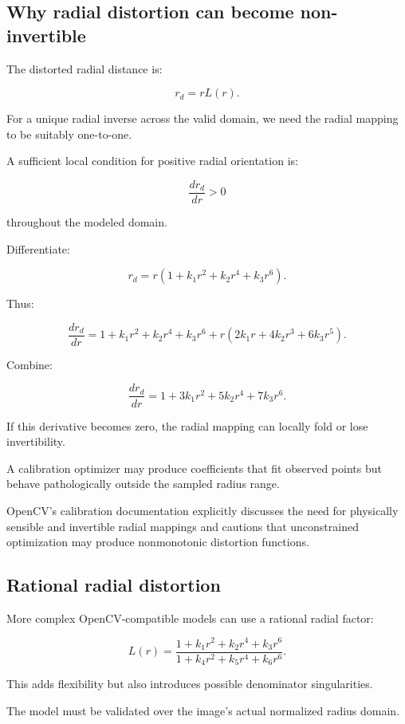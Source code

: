 \subsection{Why radial distortion can become non-invertible}\label{02-foundations-ii-ch035-why-radial-distortion-can-become-non-invertible}

The distorted radial distance is:

\[
 \boxed{ r_d=rL(r) }.
\]

For a unique radial inverse across the valid domain, we need the radial mapping to be suitably one-to-one.

A sufficient local condition for positive radial orientation is:

\[
 \boxed{ \frac{dr_d}{dr}>0 }
\]

throughout the modeled domain.

Differentiate:

\[
 r_d=r(1+k_1r^2+k_2r^4+k_3r^6).
\]

Thus:

\[
 \frac{dr_d}{dr} = 1+k_1r^2+k_2r^4+k_3r^6 +r(2k_1r+4k_2r^3+6k_3r^5).
\]

Combine:

\[
 \boxed{ \frac{dr_d}{dr} = 1+3k_1r^2+5k_2r^4+7k_3r^6 }.
\]

If this derivative becomes zero, the radial mapping can locally fold or lose invertibility.

A calibration optimizer may produce coefficients that fit observed points but behave pathologically outside the sampled radius range.

OpenCV's calibration documentation explicitly discusses the need for physically sensible and invertible radial mappings and cautions that unconstrained optimization may produce nonmonotonic distortion functions. 

\subsection{Rational radial distortion}\label{02-foundations-ii-ch035-rational-radial-distortion}

More complex OpenCV-compatible models can use a rational radial factor:

\[
 \boxed{ L(r)= \frac{ 1+k_1r^2+k_2r^4+k_3r^6 }{ 1+k_4r^2+k_5r^4+k_6r^6 } }.
\]

This adds flexibility but also introduces possible denominator singularities.

The model must be validated over the image's actual normalized radius domain.

